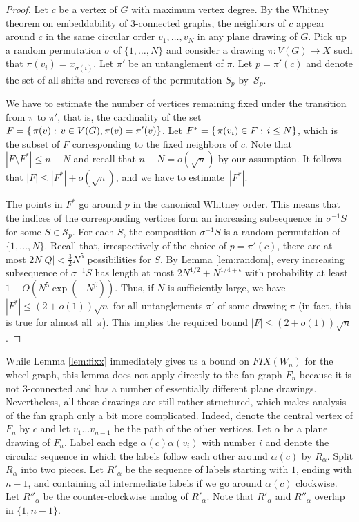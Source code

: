 \documentclass[reqno,12pt]{amsart}
\newcommand{\function}[2]{:#1 \rightarrow #2}
\newcommand{\of}[1]{\left( #1 \right)}
\newcommand{\setdef}[2]{\left\{ \hspace{0.5mm} #1 : \hspace{0.5mm} #2 \right\}}
\newcommand{\FIX}[1]{\mathit{FIX}(#1)}
\begin{document}
\begin{proof}
Let $c$ be a vertex of $G$ with maximum vertex degree. By the Whitney theorem
on embeddability of 3-connected graphs, the neighbors of $c$ appear around $c$
in the same circular order $v_1,\ldots,v_N$ in any plane drawing of $G$.
Pick up a random permutation $\sigma$ of $\{1,\ldots,N\}$ and consider
a drawing $\pi\function{V(G)}X$ such that $\pi(v_i)=x_{\sigma(i)}$.
Let $\pi'$ be an untanglement of $\pi$. Let $p=\pi'(c)$ and denote
the set of all shifts and reverses
of the permutation $S_p$ by~$\mathcal S_p$.

We have to estimate the number of vertices remaining fixed 
under the transition from $\pi$ to $\pi'$, that is, the cardinality
of the set $F=\setdef{\pi(v)}{v\in V(G), \pi(v)=\pi'(v)}$.
Let $F^*=\setdef{\pi(v_i)\in F}{i\le N}$, which is the subset of $F$
corresponding to the fixed neighbors of $c$. Note that
$|F\setminus F^*|\le n-N$ and recall that $n-N=o(\sqrt n)$ by our assumption.
It follows that $|F|\le|F^*|+o(\sqrt n)$, and we have to estimate~$|F^*|$.

The points in $F^*$ go around $p$ in the canonical Whitney order.
This means that the indices of the corresponding vertices
form an increasing subsequence in $\sigma^{-1}S$ for some $S\in\mathcal S_p$.
For each $S$, the composition $\sigma^{-1}S$ is a random permutation of $\{1,\ldots,N\}$.
Recall that, irrespectively of the choice of $p=\pi'(c)$,
there are at most $2N|Q|<\frac32N^5$ possibilities for $S$.
By Lemma \ref{lem:random}, every increasing subsequence of $\sigma^{-1}S$
has length at most $2N^{1/2}+N^{1/4+\epsilon}$ with probability at least $1-O(N^5\exp\of{-N^\beta})$.
Thus, if $N$ is sufficiently large, we have $|F^*|\le(2+o(1))\sqrt n$ for all
untanglements $\pi'$ of some drawing $\pi$ (in fact, this is true
for almost all~$\pi$). This implies the required bound $|F|\le(2+o(1))\sqrt n$.
\end{proof}

While Lemma \ref{lem:fixx} immediately gives us a bound on $\FIX{W_n}$
for the wheel graph, this lemma does not apply directly to the fan graph $F_n$ 
because it is not 3-connected and has a number of essentially different plane drawings. 
Nevertheless, all these drawings are still rather structured, which makes
analysis of the fan graph only a bit more complicated.
Indeed, denote the central vertex of $F_n$ by $c$ and let $v_1\ldots v_{n-1}$ 
be the path of the other vertices.
Let $\alpha$ be a plane drawing of $F_n$. Label each edge $\alpha(c)\alpha(v_i)$
with number $i$ and denote the circular sequence in which the labels follow each other
around $\alpha(c)$ by $R_\alpha$. Split $R_\alpha$ into two pieces.
Let $R'_\alpha$ be the sequence of labels starting with $1$, ending with $n-1$,
and containing all intermediate labels if we go around $\alpha(c)$ clockwise.
Let $R''_\alpha$ be the counter-clockwise analog of $R'_\alpha$.
Note that $R'_\alpha$ and $R''_\alpha$ overlap in $\{1,n-1\}$.
\end{document}
